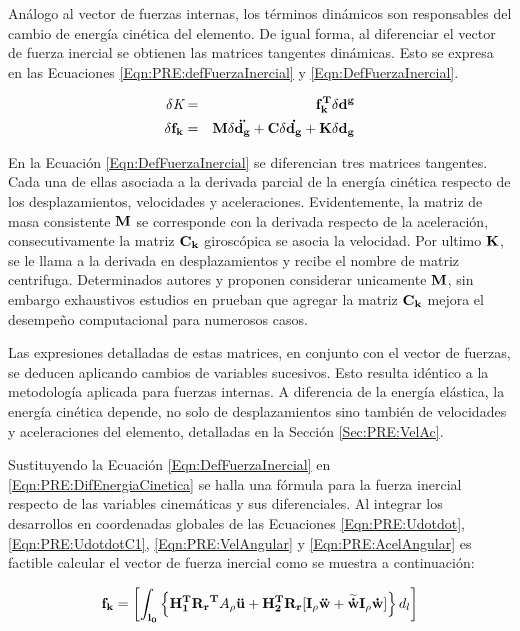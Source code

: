 Análogo al vector de fuerzas internas, los términos dinámicos son responsables del cambio de energía cinética del elemento. De igual forma, al diferenciar el vector de fuerza inercial se obtienen las matrices tangentes dinámicas. Esto se expresa en las Ecuaciones \eqref{Eqn:PRE:defFuerzaInercial} y \eqref{Eqn:DefFuerzaInercial}.  

\begin{eqnarray}
		\label{Eqn:PRE:defFuerzaInercial}
	\delta\textit{K}&=&\bf{f_k^T}\delta\bf{d}^g\\
	\label{Eqn:DefFuerzaInercial}
	\delta\bf{f_k}&=& \bf{M}\delta \ddot{\bf{d_g}}+\bf{C}\delta
	\dot{\bf{d_g}}+\bf{K}\delta{\bf{d_g}} 
\end{eqnarray}


En la Ecuación \ref{Eqn:DefFuerzaInercial} se diferencian tres matrices tangentes. Cada una de ellas asociada a la derivada parcial de la energía cinética respecto de los desplazamientos, velocidades y aceleraciones. Evidentemente, la matriz de masa consistente $\bf{M}$ se corresponde con la derivada respecto de la aceleración, consecutivamente la matriz $\bf{C_k}$
giroscópica se asocia la velocidad. Por ultimo $\bf{K}$, se le llama a la derivada en desplazamientos y recibe el nombre de matriz centrifuga. Determinados autores \cite{cardona1988beam} y \cite{hsiao1999consistent} proponen considerar unicamente $\bf{M}$, sin embargo exhaustivos estudios en \citep{hsiao1999consistent} prueban que agregar la matriz $\bf{C_k}$ mejora el desempeño computacional para numerosos casos. 

Las expresiones detalladas de estas matrices, en conjunto con el vector de fuerzas, se deducen aplicando cambios de variables sucesivos. Esto resulta idéntico a la metodología aplicada para fuerzas internas. A diferencia de la energía elástica, la energía cinética depende, no solo de desplazamientos sino también de velocidades y aceleraciones del elemento, detalladas en la Sección \ref{Sec:PRE:VelAc}.

Sustituyendo la Ecuación \eqref{Eqn:DefFuerzaInercial} en \eqref{Eqn:PRE:DifEnergiaCinetica} se halla una fórmula para la fuerza inercial respecto de las variables cinemáticas y sus diferenciales. Al integrar los desarrollos en coordenadas globales de las Ecuaciones \eqref{Eqn:PRE:Udotdot}, \eqref{Eqn:PRE:UdotdotC1}, \eqref{Eqn:PRE:VelAngular} y \eqref{Eqn:PRE:AcelAngular}  es factible calcular el vector de fuerza inercial como se muestra a continuación:

\begin{equation}\label{Eqn:PRE:FuerzaInercial}
\bf{f}_k=\left [ \int _{l_0} \left \{ \bf{H}_1^T\bf{R_r}^T \text{$A_\rho$}\ddot{\bf{u}} +\bf{H}_2^T \bf{R_r} [\bf{I}_\rho\ddot{\bf{w}}+\widetilde{\dot{\bf{w}}}\bf{I}_\rho\dot{w}] \right \} \text{$d_l$} \right  ]
\end{equation} 
 
